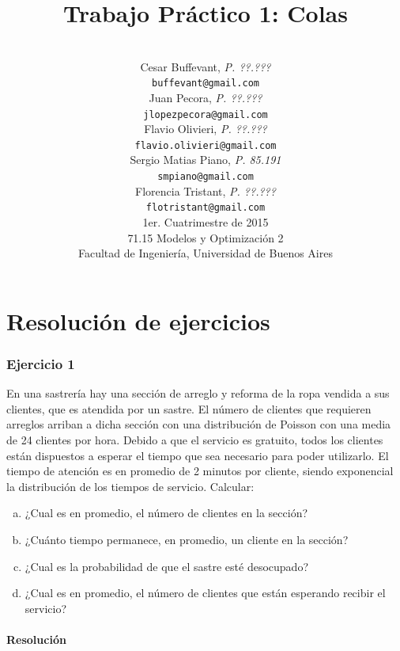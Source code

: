 \documentclass[a4paper,11pt]{article}
\title{\textbf{Trabajo Práctico 1: Colas}}
\author{\\
  Cesar Buffevant, \textit{P. ??.???}                              \\
  \texttt{buffevant@gmail.com}                                     \\ [2.5ex]
  Juan Pecora, \textit{P. ??.???}                                  \\
  \texttt{jlopezpecora@gmail.com}                                  \\ [2.5ex]
  Flavio Olivieri, \textit{P. ??.???}                              \\
  \texttt{flavio.olivieri@gmail.com}                               \\ [2.5ex]
  Sergio Matias Piano, \textit{P. 85.191}                          \\
  \texttt{smpiano@gmail.com}                                       \\ [2.5ex]
  Florencia Tristant, \textit{P. ??.???}                           \\
  \texttt{flotristant@gmail.com}                                   \\ [2.5ex]
  \normalsize{1er. Cuatrimestre de 2015}                           \\
  \normalsize{71.15 Modelos y Optimización 2}                      \\
  \normalsize{Facultad de Ingeniería, Universidad de Buenos Aires} \\
}
\date{}
\begin{document}
\thispagestyle{empty}
\maketitle

\clearpage

\tableofcontents
\clearpage

\part{Resolución de ejercicios}
\section{\textbf{Ejercicio 1}}

\baselineskip=13pt
En una sastrería hay una sección de arreglo y reforma de la ropa vendida a sus
clientes, que es atendida por un sastre. El número de clientes que requieren
arreglos arriban a dicha sección con una distribución de Poisson con una media
de 24 clientes por hora. Debido a que el servicio es gratuito, todos los
clientes están dispuestos a esperar el tiempo que sea necesario para poder
utilizarlo. El tiempo de atención es en promedio de 2 minutos por cliente,
siendo exponencial la distribución de los tiempos de servicio. Calcular:

\leftskip=36pt
\parindent=-18pt
\begin{enumerate}[a)]
  \item ¿Cual es en promedio, el número de clientes en la sección?

  \item ¿Cuánto tiempo permanece, en promedio, un cliente en la sección?

  \item ¿Cual es la probabilidad de que el sastre esté desocupado?

  \item ¿Cual es en promedio, el número de clientes que están esperando recibir
    el servicio?
\end{enumerate}

\vspace{13pt}
\leftskip=0pt
\parindent=0pt
\subsection{\textbf{Resolución}}
\end{document}
